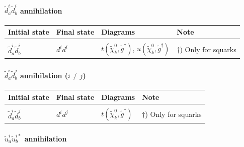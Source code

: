 \documentclass[a4paper,10pt,oneside]{book}
\newcommand{\tabspace}{\\[-2.5ex]}
\begin{document}
\paragraph{$\tilde{d}^i_{a}\tilde{d}_{b}^{i}$ annihilation}

\begin{center}
\begin{tabular}{llll} \hline
{\bfseries Initial state} & {\bfseries Final state} &
{\bfseries Diagrams} & {\bfseries Note} \\ \hline \tabspace
$\tilde{d}^i_a\tilde{d}^{i}_b$ & $d^i d^i$ &
$t(\tilde{\chi}_{k}^0,\tilde{g}^\dagger)$, $u(\tilde{\chi}_{k}^0,\tilde{g}^\dagger)$ 
& $\dagger$) Only for squarks \\ \hline
\end{tabular}
\end{center}

\paragraph{$\tilde{d}^i_{a}\tilde{d}_{b}^{j}$ annihilation ($i \ne j$)}

\begin{center}
\begin{tabular}{llll} \hline
{\bfseries Initial state} & {\bfseries Final state} &
{\bfseries Diagrams} & {\bfseries Note} \\ \hline \tabspace
$\tilde{d}^i_a\tilde{d}^{j}_b$ & $d^i d^j$ &
$t(\tilde{\chi}_{k}^0,\tilde{g}^\dagger)$
& $\dagger$) Only for squarks \\ \hline
\end{tabular}
\end{center}

\paragraph{$\tilde{u}^i_{a}\tilde{u}_{b}^{i*}$ annihilation}
\end{document}
